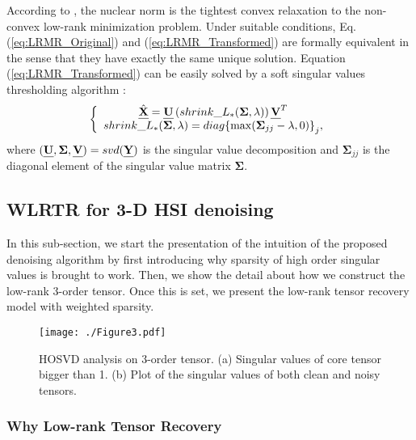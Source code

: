 \documentclass[twocolumn]{svjour3}          %
\begin{document}
    According to \cite{candes2009exact}, the nuclear norm is the tightest convex relaxation to the non-convex low-rank minimization problem. Under suitable conditions, Eq. (\ref{eq:LRMR_Original}) and (\ref{eq:LRMR_Transformed}) are formally equivalent in the sense that they have exactly the same unique solution. Equation (\ref{eq:LRMR_Transformed}) can be easily solved by a soft singular values thresholding algorithm \cite{cai2010singular}:
    \begin{equation}\label{eq:2D Solution}
    \setlength{\abovedisplayskip}{2pt}
    \setlength{\belowdisplayskip}{2pt}
    \left\{ {\begin{array}{*{20}{c}}
    {\hat{\textbf{\emph{X}}} = \textbf{\emph{U}}\left( {shrink\_{L_ * }(\mathbf{\Sigma} ,\lambda )} \right){\textbf{\emph{V}}^T}}\\
    {shrink\_{L_ * }(\mathbf{\Sigma} ,\lambda ) = diag{{\{\max ({\mathbf{\Sigma} _{jj}} - \lambda ,0)\} }_j},}
    \end{array}} \right.
    \end{equation}
    where $(\textbf{\emph{U}},\mathbf{\Sigma },\textbf{\emph{V}}) = svd(\textbf{\emph{Y}})$ is the singular value decomposition and ${\mathbf{\Sigma} _{jj}}$ is the diagonal element of the singular value matrix ${\mathbf{\Sigma}}$.

  \subsection{WLRTR for 3-D HSI denoising}
    In this sub-section, we start the presentation of the intuition of the proposed denoising algorithm by first introducing why sparsity of high order singular values is brought to work. Then, we show the detail about how we construct the low-rank 3-order tensor. Once this is set, we present the low-rank tensor recovery model with weighted sparsity.

\begin{figure}
    \texttt{[image: ./Figure3.pdf]}
   \caption{HOSVD analysis on 3-order tensor. (a) Singular values of core tensor bigger than 1. (b) Plot of the singular values of both clean and noisy tensors.}
\label{HOSVD Illustration}
\end{figure}

  \subsubsection{Why Low-rank Tensor Recovery}
\end{document}
